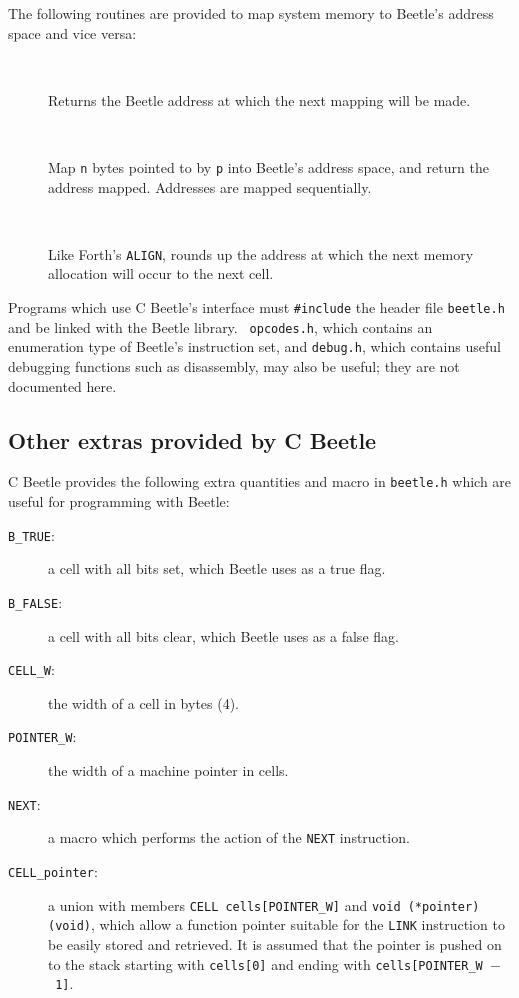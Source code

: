 \documentclass[english]{article}
\newlength{\ifacewidth}\ifacewidth=\textwidth \advance\ifacewidth by -0.1in
\newlength{\innerwidth}\innerwidth=\ifacewidth \advance\innerwidth by -0.5in
\newcommand{\ifacec}[2]{\item[]\parbox{\ifacewidth}{\hspace*{2.5mm}{\tt #1}\\[0.5ex]\hspace*{0.4in}\parbox{\innerwidth}{#2}}}
\begin{document}
The following routines are provided to map system memory to Beetle’s address space and vice versa:

\begin{description}
\ifacec{UCELL mem\_here()}{Returns the Beetle address at which the next mapping will be made.}
\ifacec{UCELL mem\_allot(void *p, size\_t n)}{Map {\tt n} bytes pointed to by {\tt p} into Beetle’s address space, and return the address mapped. Addresses are mapped sequentially.}
\ifacec{UCELL mem\_align(void)}{Like Forth’s {\tt ALIGN}, rounds up the address at which the next memory allocation will occur to the next cell.}
\end{description}

Programs which use C Beetle's interface must {\tt \#include} the header file
{\tt beetle.h} and be linked with the Beetle library. {\tt
opcodes.h}, which contains an enumeration type of Beetle's instruction set,
and {\tt debug.h}, which contains useful debugging functions such as
disassembly, may also be useful; they are not documented here.


\subsection{Other extras provided by C Beetle}

C Beetle provides the following extra quantities and macro in {\tt beetle.h}
which are useful for programming with Beetle:

\begin{description}
\item[{\tt B\_TRUE}:] a cell with all bits set, which Beetle uses as a true
flag.
\item[{\tt B\_FALSE}:] a cell with all bits clear, which Beetle uses as a
false flag.
\item[{\tt CELL\_W}:] the width of a cell in bytes (4).
\item[{\tt POINTER\_W}:] the width of a machine pointer in cells.
\item[{\tt NEXT}:] a macro which performs the action of the {\tt NEXT}
instruction.
\item[{\tt CELL\_pointer}:] a union with members {\tt CELL cells[POINTER\_W]} and {\tt void (*pointer)(void)}, which allow a function pointer suitable for the {\tt LINK} instruction to be easily stored and retrieved. It is assumed that the pointer is pushed on to the stack starting with {\tt cells[0]} and ending with {\tt cells[POINTER\_W~$-$~1]}.
\end{description}




\end{document}
